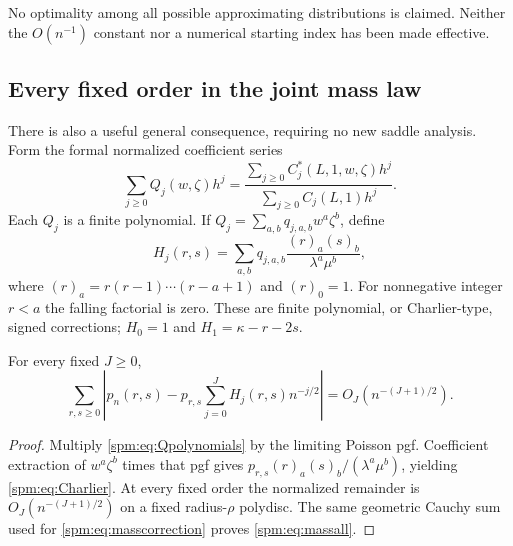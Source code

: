No optimality among all possible approximating distributions is claimed. Neither the $O(n^{-1})$ constant nor a numerical starting index has been made effective.

\subsection{Every fixed order in the joint mass law}
There is also a useful general consequence, requiring no new saddle analysis. Form the formal normalized coefficient series
\begin{equation}\label{spm:eq:Qpolynomials}
 \sum_{j\geq0}Q_j(w,\zeta)h^j
 =\frac{\sum_{j\geq0}C_j^*(L,1,w,\zeta)h^j}
        {\sum_{j\geq0}C_j(L,1)h^j}.
\end{equation}
Each $Q_j$ is a finite polynomial. If $Q_j=\sum_{a,b}q_{j,a,b}w^a\zeta^b$, define
\begin{equation}\label{spm:eq:Charlier}
 H_j(r,s)=\sum_{a,b}q_{j,a,b}
        \frac{(r)_a(s)_b}{\lambda^a\mu^b},
\end{equation}
where $(r)_a=r(r-1)\cdots(r-a+1)$ and $(r)_0=1$. For nonnegative integer $r<a$ the falling factorial is zero. These are finite polynomial, or Charlier-type, signed corrections; $H_0=1$ and $H_1=\kappa-r-2s$.

\begin{corollary}\label{spm:cor:massall}
For every fixed $J\geq0$,
\begin{equation}\label{spm:eq:massall}
 \sum_{r,s\geq0}\left|p_n(r,s)
  -p_{r,s}\sum_{j=0}^J H_j(r,s)n^{-j/2}\right|
 =O_J(n^{-(J+1)/2}).
\end{equation}
\end{corollary}
\begin{proof}
Multiply \eqref{spm:eq:Qpolynomials} by the limiting Poisson pgf. Coefficient extraction of $w^a\zeta^b$ times that pgf gives $p_{r,s}(r)_a(s)_b/(\lambda^a\mu^b)$, yielding \eqref{spm:eq:Charlier}. At every fixed order the normalized remainder is $O_J(n^{-(J+1)/2})$ on a fixed radius-$\rho$ polydisc. The same geometric Cauchy sum used for \eqref{spm:eq:masscorrection} proves \eqref{spm:eq:massall}.
\end{proof}
